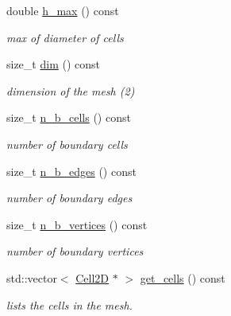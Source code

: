 \begin{DoxyCompactItemize}
double \hyperlink{group__Mesh2D_gace38332245a1d76b110a20afda8aea86}{h\+\_\+max} () const
\begin{DoxyCompactList}\small\item\em max of diameter of cells \end{DoxyCompactList}\item 
size\+\_\+t \hyperlink{group__Mesh2D_ga4d2eafb5071f68a8bd97ec78ccd1056c}{dim} () const
\begin{DoxyCompactList}\small\item\em dimension of the mesh (2) \end{DoxyCompactList}\item 
\mbox{\label{classHCore2D_1_1Mesh2D_a393805b16a24933ecc43da5d5766c381}} 
size\+\_\+t \hyperlink{classHCore2D_1_1Mesh2D_a393805b16a24933ecc43da5d5766c381}{n\+\_\+b\+\_\+cells} () const
\begin{DoxyCompactList}\small\item\em number of boundary cells \end{DoxyCompactList}\item 
\mbox{\label{classHCore2D_1_1Mesh2D_af2a2d46050a150499c1d1375a731d548}} 
size\+\_\+t \hyperlink{classHCore2D_1_1Mesh2D_af2a2d46050a150499c1d1375a731d548}{n\+\_\+b\+\_\+edges} () const
\begin{DoxyCompactList}\small\item\em number of boundary edges \end{DoxyCompactList}\item 
\mbox{\label{classHCore2D_1_1Mesh2D_a50af6c70a806781681cef7fa8a95ee58}} 
size\+\_\+t \hyperlink{classHCore2D_1_1Mesh2D_a50af6c70a806781681cef7fa8a95ee58}{n\+\_\+b\+\_\+vertices} () const
\begin{DoxyCompactList}\small\item\em number of boundary vertices \end{DoxyCompactList}\item 
std\+::vector$<$ \hyperlink{classHCore2D_1_1Cell2D}{Cell2D} $\ast$ $>$ \hyperlink{group__Mesh2D_gaf422a6559241d8e6f106d8cf355547ba}{get\+\_\+cells} () const
\begin{DoxyCompactList}\small\item\em lists the cells in the mesh. \end{DoxyCompactList}\item 

\end{DoxyCompactItemize}
